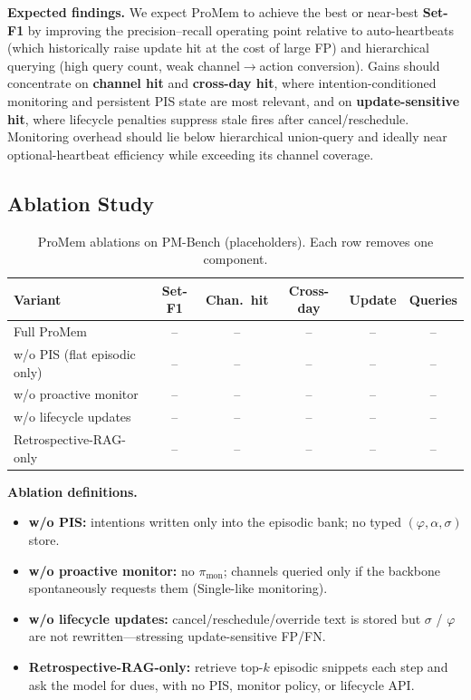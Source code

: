 \noindent\textbf{Expected findings.}
We expect ProMem to achieve the best or near-best \textbf{Set-F1} by improving the precision--recall operating point relative to auto-heartbeats (which historically raise update hit at the cost of large FP) and hierarchical querying (high query count, weak channel$\rightarrow$action conversion). Gains should concentrate on \textbf{channel hit} and \textbf{cross-day hit}, where intention-conditioned monitoring and persistent PIS state are most relevant, and on \textbf{update-sensitive hit}, where lifecycle penalties suppress stale fires after cancel/reschedule. Monitoring overhead should lie below hierarchical union-query and ideally near optional-heartbeat efficiency while exceeding its channel coverage.
\vspace{10pt}
\subsection{Ablation Study}

\begin{table}[h]
\centering
\caption{ProMem ablations on PM-Bench (placeholders). Each row removes one component.}
\setlength{\tabcolsep}{4pt}
\label{tab:ablation}
\begin{tabular}{l|ccccc}
\toprule
\textbf{Variant} & Set-F1 & Chan.\ hit & Cross-day & Update & Queries \\
\midrule
Full ProMem & -- & -- & -- & -- & -- \\
\quad w/o PIS (flat episodic only) & -- & -- & -- & -- & -- \\
\quad w/o proactive monitor & -- & -- & -- & -- & -- \\
\quad w/o lifecycle updates & -- & -- & -- & -- & -- \\
\quad Retrospective-RAG-only & -- & -- & -- & -- & -- \\
\bottomrule
\end{tabular}
\vspace{6pt}
\end{table}

\noindent\textbf{Ablation definitions.}
\begin{itemize}
    \item \textbf{w/o PIS:} intentions written only into the episodic bank; no typed $(\varphi,\alpha,\sigma)$ store.
    \item \textbf{w/o proactive monitor:} no $\pi_{\mathrm{mon}}$; channels queried only if the backbone spontaneously requests them (Single-like monitoring).
    \item \textbf{w/o lifecycle updates:} cancel/reschedule/override text is stored but $\sigma$ / $\varphi$ are not rewritten---stressing update-sensitive FP/FN.
    \item \textbf{Retrospective-RAG-only:} retrieve top-$k$ episodic snippets each step and ask the model for dues, with no PIS, monitor policy, or lifecycle API.
\end{itemize}

